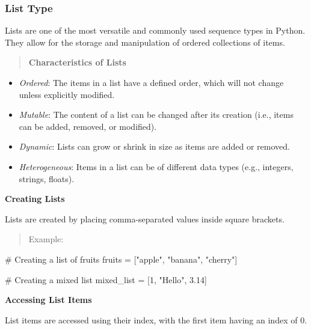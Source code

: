 \documentclass[
  letterpaper,
  DIV=11,
  numbers=noendperiod]{scrreprt}
\newenvironment{Shaded}{\begin{snugshade}}{\end{snugshade}}
\newcommand{\CommentTok}[1]{\textcolor[rgb]{0.37,0.37,0.37}{#1}}
\newcommand{\DecValTok}[1]{\textcolor[rgb]{0.68,0.00,0.00}{#1}}
\newcommand{\FloatTok}[1]{\textcolor[rgb]{0.68,0.00,0.00}{#1}}
\newcommand{\NormalTok}[1]{\textcolor[rgb]{0.00,0.23,0.31}{#1}}
\newcommand{\OperatorTok}[1]{\textcolor[rgb]{0.37,0.37,0.37}{#1}}
\newcommand{\StringTok}[1]{\textcolor[rgb]{0.13,0.47,0.30}{#1}}
\providecommand{\tightlist}{%
  \setlength{\itemsep}{0pt}\setlength{\parskip}{0pt}}\usepackage{longtable,booktabs,array}
\theoremstyle{plain}
\theoremstyle{definition}
\theoremstyle{remark}
\begin{document}
\subsubsection{List Type}\label{list-type}

Lists are one of the most versatile and commonly used sequence types in
Python. They allow for the storage and manipulation of ordered
collections of items.

\begin{quote}
\textbf{Characteristics of Lists}
\end{quote}

\begin{itemize}
\tightlist
\item
  \emph{Ordered}: The items in a list have a defined order, which will
  not change unless explicitly modified.
\item
  \emph{Mutable}: The content of a list can be changed after its
  creation (i.e., items can be added, removed, or modified).
\item
  \emph{Dynamic}: Lists can grow or shrink in size as items are added or
  removed.
\item
  \emph{Heterogeneous}: Items in a list can be of different data types
  (e.g., integers, strings, floats).
\end{itemize}

\textbf{Creating Lists}

Lists are created by placing comma-separated values inside square
brackets.

\begin{quote}
Example:
\end{quote}

\begin{Shaded}
\begin{Highlighting}[]
\CommentTok{\# Creating a list of fruits}
\NormalTok{fruits }\OperatorTok{=}\NormalTok{ [}\StringTok{"apple"}\NormalTok{, }\StringTok{"banana"}\NormalTok{, }\StringTok{"cherry"}\NormalTok{]}

\CommentTok{\# Creating a mixed list}
\NormalTok{mixed\_list }\OperatorTok{=}\NormalTok{ [}\DecValTok{1}\NormalTok{, }\StringTok{"Hello"}\NormalTok{, }\FloatTok{3.14}\NormalTok{]}
\end{Highlighting}
\end{Shaded}

\textbf{Accessing List Items}

List items are accessed using their index, with the first item having an
index of 0.
\end{document}
